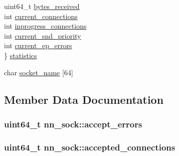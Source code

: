 \begin{DoxyCompactItemize}
\begin{tabbing}
\>uint64\_t \hyperlink{structnn__sock_a06e5eae5cb9fbc0e4dfa1b66493dfbb3}{bytes\_received}\\
\>int \hyperlink{structnn__sock_a8a421bb654c019c01b834ff521ec63b6}{current\_connections}\\
\>int \hyperlink{structnn__sock_abdd3fbe2ee545c6c9db71cfe59f6ce84}{inprogress\_connections}\\
\>int \hyperlink{structnn__sock_a5cfbcb4a54ef829b2ea9b0ffcb0d451f}{current\_snd\_priority}\\
\>int \hyperlink{structnn__sock_ae5bc76524d9e7d5aa9c5017848a87ed9}{current\_ep\_errors}\\
\} \hyperlink{structnn__sock_a1ec3bb9a8e7c01aae8b396c4d17407e8}{statistics}\\

\end{tabbing}\item 
char \hyperlink{structnn__sock_aebe586094af0e703b13eb33ccd07d35c}{socket\+\_\+name} \mbox{[}64\mbox{]}
\end{DoxyCompactItemize}


\subsection{Member Data Documentation}
\subsubsection[{accept\+\_\+errors}]{\setlength{\rightskip}{0pt plus 5cm}uint64\+\_\+t nn\+\_\+sock\+::accept\+\_\+errors}\hypertarget{structnn__sock_a404c2b224c226875a95b15fe245f9d98}{}\label{structnn__sock_a404c2b224c226875a95b15fe245f9d98}
\subsubsection[{accepted\+\_\+connections}]{\setlength{\rightskip}{0pt plus 5cm}uint64\+\_\+t nn\+\_\+sock\+::accepted\+\_\+connections}\hypertarget{structnn__sock_a4aeac0a4a30b852422bba1fac60f68a0}{}\label{structnn__sock_a4aeac0a4a30b852422bba1fac60f68a0}
